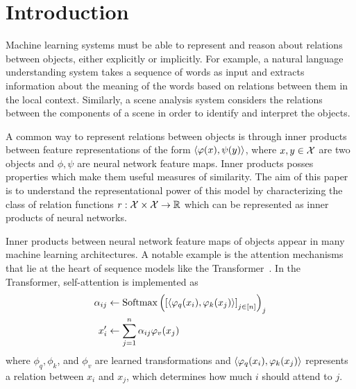 \section{Introduction}\label{sec:intro}


Machine learning systems must be able to represent and reason about relations between objects, either explicitly or implicitly. For example, a natural language understanding system takes a sequence of words as input and extracts information about the meaning of the words based on relations between them in the local context. Similarly, a scene analysis system considers the relations between the components of a scene in order to identify and interpret the objects. 

A common way to represent relations between objects is through inner products between feature representations of the form $\left \langle \varphi(x), \psi(y) \right\rangle$, where $x, y \in {\mathcal{X}}$ are two objects and $\phi, \psi$ are neural network feature maps. Inner products posses properties which make them useful measures of similarity. The aim of this paper is to understand the representational power of this model by characterizing the class of relation functions $r: {\mathcal{X}} \times {\mathcal{X}} \to \mathbb{R}$ which can be represented as inner products of neural networks.

Inner products between neural network feature maps of objects appear in many machine learning architectures. A notable example is the attention mechanisms that lie at the heart of sequence models like the Transformer~\parencite{vaswani2017attention}. In the Transformer, self-attention is implemented as
\begin{equation*}
    \begin{split}
        \alpha_{ij} &\gets \mathrm{Softmax}\paren{\bra{{\iprod{\phi_q(x_i)}{\phi_k(x_j)}}}_{j \in [n]}}_j\\
        x_i' &\gets \sum_{j=1}^{n} \alpha_{ij} \phi_v(x_j)
    \end{split}
\end{equation*}
where $\phi_q, \phi_k$, and $\phi_v$ are learned transformations and $\left \langle \varphi_q(x_i), \varphi_k(x_j) \right\rangle$ represents a relation between $x_i$ and $x_j$, which determines how much $i$ should attend to $j$.

